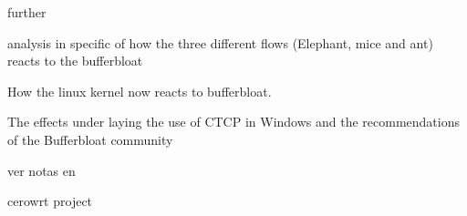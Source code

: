 further

analysis in specific of how the three different flows (Elephant, mice and ant)\cite{HaElephants} \cite{evolvshortlongflows} reacts to the bufferbloat

How the linux kernel now reacts to bufferbloat. \cite{TokeLinux}

The effects under laying the use of CTCP\cite{Tan06compoundtcp}\cite{4146841} in Windows and the recommendations of the Bufferbloat community\cite{windowstips}

ver notas en \cite{MathisMacroCAA}

cerowrt project \cite{cerowrt}

